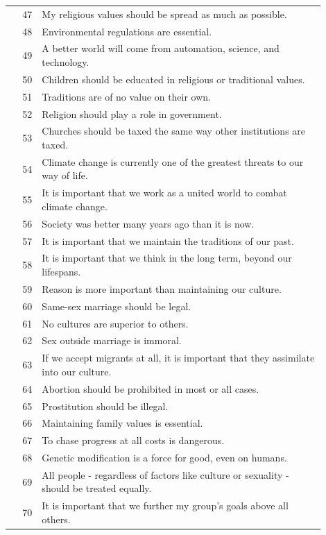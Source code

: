 \documentclass[11pt]{article}
\begin{document}
\begin{longtable}{r p{0.9\linewidth}}
\rowcolor{evScty} 47 & My religious values should be spread as much as possible. \\
\rowcolor{evScty} 48 & Environmental regulations are essential. \\
\rowcolor{evScty} 49 & A better world will come from automation, science, and technology. \\
\rowcolor{evScty} 50 & Children should be educated in religious or traditional values. \\
\rowcolor{evScty} 51 & Traditions are of no value on their own. \\
\rowcolor{evScty} 52 & Religion should play a role in government. \\
\rowcolor{evScty} 53 & Churches should be taxed the same way other institutions are taxed. \\
\rowcolor{evScty} 54 & Climate change is currently one of the greatest threats to our way of life. \\
\rowcolor{evScty} 55 & It is important that we work as a united world to combat climate change. \\
\rowcolor{evScty} 56 & Society was better many years ago than it is now. \\
\rowcolor{evScty} 57 & It is important that we maintain the traditions of our past. \\
\rowcolor{evScty} 58 & It is important that we think in the long term, beyond our lifespans. \\
\rowcolor{evScty} 59 & Reason is more important than maintaining our culture. \\
\rowcolor{evScty} 60 & Same-sex marriage should be legal. \\
\rowcolor{evScty} 61 & No cultures are superior to others. \\
\rowcolor{evScty} 62 & Sex outside marriage is immoral. \\
\rowcolor{evScty} 63 & If we accept migrants at all, it is important that they assimilate into our culture. \\
\rowcolor{evScty} 64 & Abortion should be prohibited in most or all cases. \\
\rowcolor{evScty} 65 & Prostitution should be illegal. \\
\rowcolor{evScty} 66 & Maintaining family values is essential. \\
\rowcolor{evScty} 67 & To chase progress at all costs is dangerous. \\
\rowcolor{evScty} 68 & Genetic modification is a force for good, even on humans. \\

\rowcolor{evUniv} 69 & All people - regardless of factors like culture or sexuality - should be treated equally. \\
\rowcolor{evUniv} 70 & It is important that we further my group's goals above all others. \\

\end{longtable}
\end{document}
